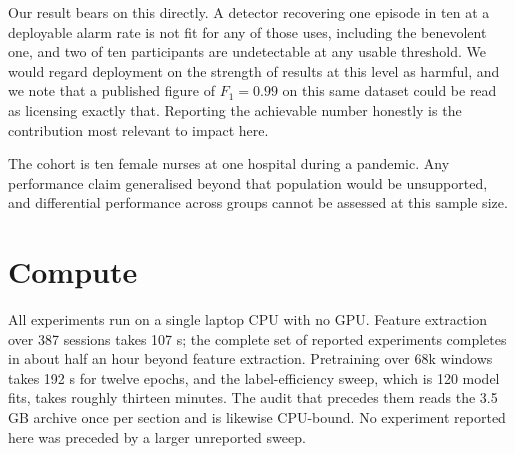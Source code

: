 \documentclass{article}
\begin{document}
Our result bears on this directly. A detector recovering one episode in ten at
a deployable alarm rate is not fit for any of those uses, including the
benevolent one, and two of ten participants are undetectable at any usable
threshold. We would regard deployment on the strength of results at this level
as harmful, and we note that a published figure of $F_1 = 0.99$ on this same
dataset could be read as licensing exactly that. Reporting the achievable
number honestly is the contribution most relevant to impact here.

The cohort is ten female nurses at one hospital during a pandemic. Any
performance claim generalised beyond that population would be unsupported, and
differential performance across groups cannot be assessed at this sample size.

\section{Compute} All experiments run on a single laptop CPU with no GPU.
Feature extraction over 387 sessions takes 107 s; the complete set
of reported experiments completes in about half an hour beyond feature
extraction. Pretraining over 68k windows takes 192 s for twelve epochs, and the
label-efficiency sweep, which is 120 model fits, takes roughly thirteen
minutes. The audit that precedes
them reads the 3.5 GB archive once per section and is likewise
CPU-bound. No experiment reported here was preceded by a larger unreported
sweep.



\newpage

\end{document}
